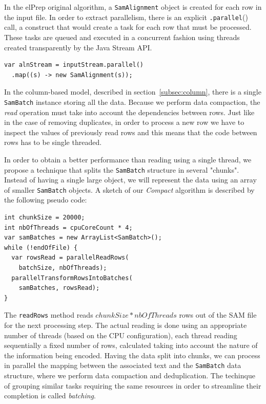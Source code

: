 \documentclass[a4paper,twoside]{article}
\begin{document}
In the elPrep original algorithm, a {\texttt{SamAlignment}} object is created for each row in the input file.
In order to extract parallelism, there is an explicit {\texttt{.parallel}()} call, a construct that would create a task for each row that must be processed.
These tasks are queued and executed in a concurrent fashion using threads created transparently by the Java Stream API.
\begin{verbatim}
var alnStream = inputStream.parallel()
  .map((s) -> new SamAlignment(s));
\end{verbatim}
In the column-based model, described in section~\ref{subsec:column}, there is a single {\texttt{SamBatch}} instance storing all the data.
Because we perform data compaction, the {\textit{read}} operation must take into account the dependencies between rows. Just like in the case of removing duplicates, in order to process a new row we have to inspect the values of previously read rows and this means that the code between rows has to be single threaded.

In order to obtain a better performance than reading using a single thread, we propose a technique that splits the {\texttt{SamBatch}} structure in several "chunks".
Instead of having a single large object, we will represent the data using an array of smaller {\texttt{SamBatch}} objects.
A sketch of our {\textit{Compact}} algorithm is described by the following pseudo code:

\begin{verbatim}
int chunkSize = 20000;
int nbOfThreads = cpuCoreCount * 4;
var samBatches = new ArrayList<SamBatch>();
while (!endOfFile) {
  var rowsRead = parallelReadRows(
    batchSize, nbOfThreads);
  parallelTransformRowsIntoBatches(
    samBatches, rowsRead);
}
\end{verbatim}

The {\texttt{readRows}} method reads $chunkSize * nbOfThreads$ rows out of the SAM file for the next processing step.
The actual reading is done using an appropriate number of threads (based on the CPU configuration), each thread reading sequentially a fixed number of rows, calculated taking into account the nature of the information being encoded.
Having the data split into chunks, we can process in parallel the mapping between the associated text and the {\texttt{SamBatch}} data structure, where we perform data compaction and deduplication.
The techinque of grouping similar tasks requiring the same resources in order to streamline their completion is called {\textit{batching}}.
\end{document}
